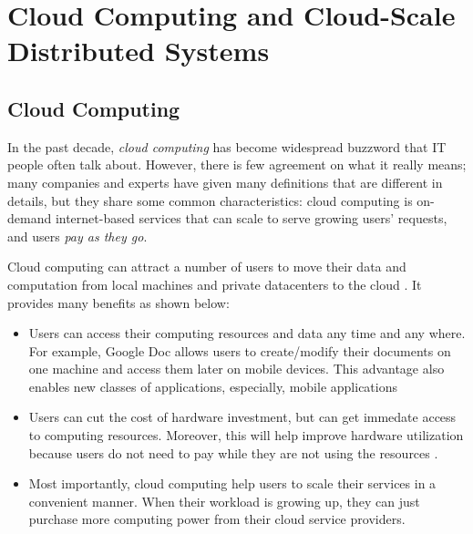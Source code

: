 \section{Cloud Computing and Cloud-Scale Distributed Systems}
\label{bg-cloud}

\subsection{Cloud Computing}

In the past decade, \textit{cloud computing} has become widespread buzzword
that IT people often talk about. However, there is few agreement on what it
really means; many companies and experts have given many definitions
\cite{TwentyoneCloudDef, IBMCloudDef, PCMagCloudDef, Foster+08-CloudAndGrid}
that are different in details, but they share some common characteristics: cloud
computing is on-demand internet-based services that can scale to serve growing
users' requests, and users \textit{pay as they go}.


Cloud computing can attract a number of users to move their data and
computation from local machines and private datacenters to the cloud
\cite{AdobeCloudStat, AWSCustomer, GmailStat, GoogleDriveStat, DropboxStat,
AstroInCloud, FacebookStat, Luo+16-BigDataBioResearch}.
It provides many benefits as shown below:
\begin{itemize}
\item Users can access their computing resources and data any time and any
where. For example, Google Doc allows users to create/modify their documents on
one machine and access them later on mobile devices. This advantage also
enables new classes of applications, especially, mobile applications
\cite{DropboxWebsite, GmailWebsite, GoogleDriveWebsite, iCloudWebsite,
SiriWebsite} 

\item Users can cut the cost of hardware investment, but can get immedate access
to computing resources. Moreover, this will help improve hardware utilization
because users do not need to pay while they are not using the resources
\cite{Marston+11-CloudBusiness}.

\item Most importantly, cloud computing help users to scale their services in a
convenient manner. When their workload is growing up, they can just purchase
more computing power from their cloud service providers.
\end{itemize}

